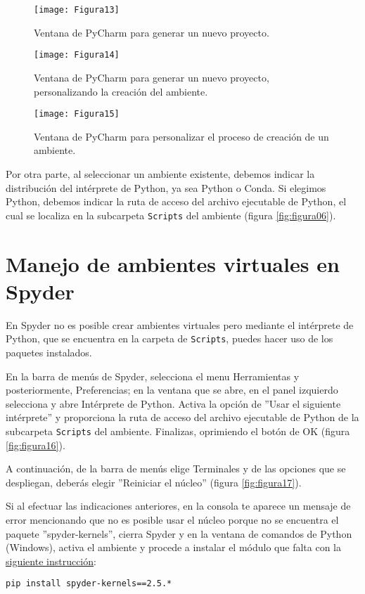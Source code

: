 \begin{figure}[H]
\centering
\texttt{[image: Figura13]}
\caption{Ventana de PyCharm para generar un nuevo proyecto.}
\label{fig:figura13}
\end{figure}
	
\begin{figure}[H]
\centering
\texttt{[image: Figura14]}
\caption{Ventana de PyCharm para generar un nuevo proyecto, personalizando la creación del ambiente.}
\label{fig:figura14}
\end{figure}
	
\begin{figure}[H]
\centering
\texttt{[image: Figura15]}
\caption{Ventana de PyCharm para personalizar el proceso de creación de un ambiente.}
\label{fig:figura15}
\end{figure}
	
Por otra parte, al seleccionar un ambiente existente, debemos indicar la distribución del intérprete de Python, ya sea Python o Conda. Si elegimos Python, debemos indicar la ruta de acceso del archivo ejecutable de Python, el cual se localiza en la subcarpeta \texttt{Scripts} del ambiente (figura \ref{fig:figura06}).
	
\section{Manejo de ambientes virtuales en Spyder}
En Spyder no es posible crear ambientes virtuales pero mediante el intérprete de Python, que se encuentra en la carpeta de \texttt{Scripts}, puedes hacer uso de los paquetes instalados. \bigskip
	
En la barra de menús de Spyder, selecciona el menu Herramientas y posteriormente, Preferencias; en la ventana que se abre, en el panel izquierdo selecciona y abre Intérprete de Python. Activa la opción de ''Usar el siguiente intérprete'' y proporciona la ruta de acceso del archivo ejecutable de Python de la subcarpeta \texttt{Scripts} del ambiente. Finalizas, oprimiendo el botón de OK (figura \ref{fig:figura16}).\bigskip
	
A continuación, de la barra de menús elige Terminales y de las opciones que se despliegan, deberás elegir ''Reiniciar el núcleo'' (figura \ref{fig:figura17}). \bigskip 
	
Si al efectuar las indicaciones anteriores, en la consola te aparece un mensaje de error mencionando que no es posible usar el núcleo porque no se encuentra el paquete ''spyder-kernels'', cierra Spyder y en la ventana de comandos de Python (Windows), activa el ambiente y procede a instalar el módulo que falta con la  \href{https://pypi.org/project/spyder-kernels/}{siguiente instrucción}:
\begin{verbatim}
pip install spyder-kernels==2.5.*
\end{verbatim}
	
